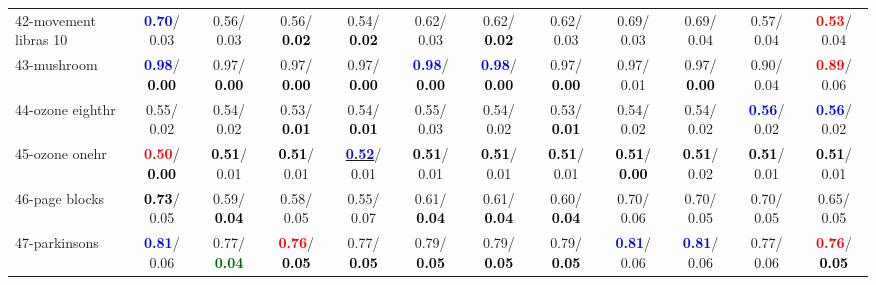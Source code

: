 \begin{table}[h]
\begin{center}
{\begin{tabular}{lc|c|c|c|c|c|c|c|c|c|c}
42-movement libras 10 & \textcolor{blue}{\textbf{  0.70}}/  0.03 &   0.56/  0.03 &   0.56/\textcolor{black}{\textbf{  0.02}} &   0.54/\textcolor{black}{\textbf{  0.02}} &   0.62/  0.03 &   0.62/\textcolor{black}{\textbf{  0.02}} &   0.62/  0.03 &   0.69/  0.03 &   0.69/  0.04 &   0.57/  0.04 & \textcolor{red}{\textbf{  0.53}}/  0.04 \\
43-mushroom & \textcolor{blue}{\textbf{  0.98}}/\textcolor{black}{\textbf{  0.00}} &   0.97/\textcolor{black}{\textbf{  0.00}} &   0.97/\textcolor{black}{\textbf{  0.00}} &   0.97/\textcolor{black}{\textbf{  0.00}} & \textcolor{blue}{\textbf{  0.98}}/\textcolor{black}{\textbf{  0.00}} & \textcolor{blue}{\textbf{  0.98}}/\textcolor{black}{\textbf{  0.00}} &   0.97/\textcolor{black}{\textbf{  0.00}} &   0.97/  0.01 &   0.97/\textcolor{black}{\textbf{  0.00}} &   0.90/  0.04 & \textcolor{red}{\textbf{  0.89}}/  0.06 \\
44-ozone eighthr &   0.55/  0.02 &   0.54/  0.02 &   0.53/\textcolor{black}{\textbf{  0.01}} &   0.54/\textcolor{black}{\textbf{  0.01}} &   0.55/  0.03 &   0.54/  0.02 &   0.53/\textcolor{black}{\textbf{  0.01}} &   0.54/  0.02 &   0.54/  0.02 & \textcolor{blue}{\textbf{  0.56}}/  0.02 & \textcolor{blue}{\textbf{  0.56}}/  0.02 \\
45-ozone onehr & \textcolor{red}{\textbf{  0.50}}/\textcolor{black}{\textbf{  0.00}} & \textcolor{black}{\textbf{  0.51}}/  0.01 & \textcolor{black}{\textbf{  0.51}}/  0.01 & \underline{\textcolor{blue}{\textbf{  0.52}}}/  0.01 & \textcolor{black}{\textbf{  0.51}}/  0.01 & \textcolor{black}{\textbf{  0.51}}/  0.01 & \textcolor{black}{\textbf{  0.51}}/  0.01 & \textcolor{black}{\textbf{  0.51}}/\textcolor{black}{\textbf{  0.00}} & \textcolor{black}{\textbf{  0.51}}/  0.02 & \textcolor{black}{\textbf{  0.51}}/  0.01 & \textcolor{black}{\textbf{  0.51}}/  0.01 \\
46-page blocks & \textcolor{black}{\textbf{  0.73}}/  0.05 &   0.59/\textcolor{black}{\textbf{  0.04}} &   0.58/  0.05 &   0.55/  0.07 &   0.61/\textcolor{black}{\textbf{  0.04}} &   0.61/\textcolor{black}{\textbf{  0.04}} &   0.60/\textcolor{black}{\textbf{  0.04}} &   0.70/  0.06 &   0.70/  0.05 &   0.70/  0.05 &   0.65/  0.05 \\ \hline
47-parkinsons & \textcolor{blue}{\textbf{  0.81}}/  0.06 &   0.77/\textcolor{darkgreen}{\textbf{  0.04}} & \textcolor{red}{\textbf{  0.76}}/\textcolor{black}{\textbf{  0.05}} &   0.77/\textcolor{black}{\textbf{  0.05}} &   0.79/\textcolor{black}{\textbf{  0.05}} &   0.79/\textcolor{black}{\textbf{  0.05}} &   0.79/\textcolor{black}{\textbf{  0.05}} & \textcolor{blue}{\textbf{  0.81}}/  0.06 & \textcolor{blue}{\textbf{  0.81}}/  0.06 &   0.77/  0.06 & \textcolor{red}{\textbf{  0.76}}/\textcolor{black}{\textbf{  0.05}} \\

\end{tabular}}
\end{center}
\end{table}
